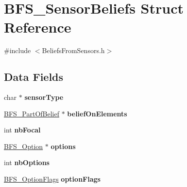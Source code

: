 \hypertarget{struct_b_f_s___sensor_beliefs}{
\section{BFS\_\-SensorBeliefs Struct Reference}
\label{struct_b_f_s___sensor_beliefs}
}


{\ttfamily \#include $<$BeliefsFromSensors.h$>$}

\subsection*{Data Fields}
\begin{DoxyCompactItemize}
\item 
\hypertarget{struct_b_f_s___sensor_beliefs_a0e4608088550200592587c681b7a8f74}{
char $\ast$ {\bfseries sensorType}}
\label{struct_b_f_s___sensor_beliefs_a0e4608088550200592587c681b7a8f74}

\item 
\hypertarget{struct_b_f_s___sensor_beliefs_a818a0088a0be15ad2dcf2295bc4780e8}{
\hyperlink{struct_b_f_s___part_of_belief}{BFS\_\-PartOfBelief} $\ast$ {\bfseries beliefOnElements}}
\label{struct_b_f_s___sensor_beliefs_a818a0088a0be15ad2dcf2295bc4780e8}

\item 
\hypertarget{struct_b_f_s___sensor_beliefs_af154415155c6b73acc53d18de0c615d9}{
int {\bfseries nbFocal}}
\label{struct_b_f_s___sensor_beliefs_af154415155c6b73acc53d18de0c615d9}

\item 
\hypertarget{struct_b_f_s___sensor_beliefs_ad4238c5803b0f94646e98aaed76db68f}{
\hyperlink{struct_b_f_s___option}{BFS\_\-Option} $\ast$ {\bfseries options}}
\label{struct_b_f_s___sensor_beliefs_ad4238c5803b0f94646e98aaed76db68f}

\item 
\hypertarget{struct_b_f_s___sensor_beliefs_a8356fb2585c0c61557ab4dce52070743}{
int {\bfseries nbOptions}}
\label{struct_b_f_s___sensor_beliefs_a8356fb2585c0c61557ab4dce52070743}

\item 
\hypertarget{struct_b_f_s___sensor_beliefs_a5e8366f2f98089ee4e325dbabb598efc}{
\hyperlink{_beliefs_from_sensors_8h_aa63e28a9dbd4627103f9bd3211cbcd6e}{BFS\_\-OptionFlags} {\bfseries optionFlags}}
\label{struct_b_f_s___sensor_beliefs_a5e8366f2f98089ee4e325dbabb598efc}

\end{DoxyCompactItemize}


